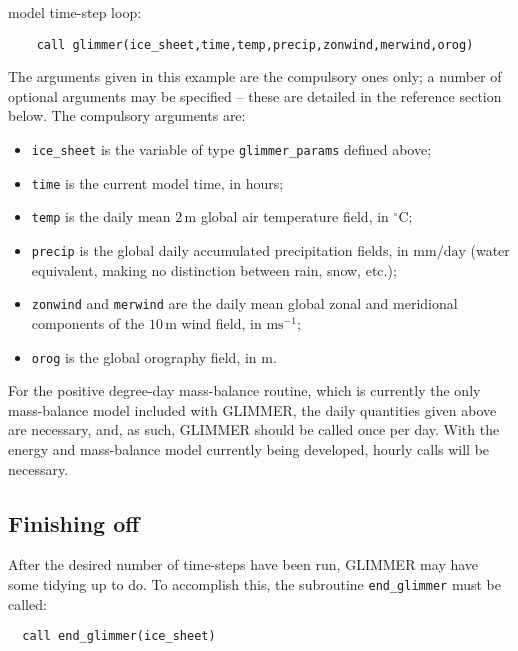 \documentclass[11pt]{article}
\begin{document}
model time-step loop:
%
\begin{verbatim}
    call glimmer(ice_sheet,time,temp,precip,zonwind,merwind,orog)
\end{verbatim} 
%
The arguments given in this example are the compulsory ones only; a number of
optional arguments may be specified -- these are detailed in the reference
section below. The compulsory arguments are:
%
\begin{itemize}
\item \texttt{ice\_sheet} is the variable of type \texttt{glimmer\_params}
 defined above;
\item \texttt{time} is the current model time, in hours;
\item \texttt{temp} is the daily mean $2\,\mathrm{m}$ global air temperature field, in
  $^{\circ}\mathrm{C}$;
\item \texttt{precip} is the global daily accumulated precipitation fields,
  in $\mathrm{mm}/\mathrm{day}$ (water equivalent, making no distinction
  between rain, snow, etc.);
\item \texttt{zonwind} and \texttt{merwind} are the daily mean global zonal and
  meridional components of the $10\,\mathrm{m}$ wind field, in
  $\mathrm{ms}^{-1}$;
\item \texttt{orog} is the global orography field, in $\mathrm{m}$.
\end{itemize}
%
For the positive degree-day mass-balance routine, which is currently the only
mass-balance model included with GLIMMER, the daily quantities given above are
necessary, and, as such, GLIMMER should be called once per day. With the
energy and mass-balance model currently being developed, hourly calls will be
necessary. 
%
\subsection{Finishing off}
%
After the desired number of time-steps have been run, GLIMMER may have some
tidying up to do. To accomplish this, the subroutine \texttt{end\_glimmer}
must be called:
%
\begin{verbatim}
  call end_glimmer(ice_sheet)
\end{verbatim}
%
\end{document}
